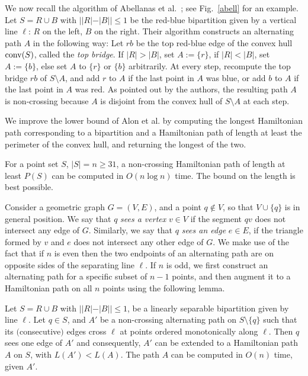 \documentclass[proceedings]{stacs}
\begin{document}
We now recall the algorithm of Abellanas et al.~\cite{AGH+99};
see Fig.~\ref{abell} for an example.
Let $S=R \cup B$ with $||R|-|B|| \leq 1$ be the red-blue bipartition
given by a vertical line $\ell$: $R$ on the left, $B$ on the right.
Their algorithm constructs an alternating path $A$ in the following way:
Let $rb$ be the top red-blue edge of
the convex hull ${\rm conv}(S)$, called the {\em top bridge}. If $|R|>|B|$,
set $A := \{r\}$, if $|R|<|B|$, set $A := \{b\}$, else
set $A$ to $\{r\}$ or $\{b\}$ arbitrarily. At every step, recompute
the top bridge $rb$ of $S \setminus A$, and add $r$ to $A$
if the last point in $A$ was blue, or add $b$ to $A$
if the last point in $A$ was red.  As pointed out by the authors, the
resulting path $A$ is non-crossing because $A$ is disjoint from the
convex hull of $S \setminus A$ at each step.

We improve the lower bound of Alon et al. by computing the longest
Hamiltonian path corresponding to a bipartition and a Hamiltonian path of
length at least the perimeter of the convex hull, and returning the
longest of the two.
\begin{lemma} \label{L1}
For a point set $S$, $|S| =n \geq 31$, a non-crossing Hamiltonian
path of length at least $P(S)$ can be computed in $O(n \log{n})$
time. The bound on the length is best possible.
\end{lemma}


Consider a geometric graph $G=(V,E)$, and a point $q \notin V$,
so that $V \cup \{q\}$ is in general position.
We say that $q$ {\em sees a vertex} $v \in V$ if the segment $q v$  does not intersect any
edge of $G$. Similarly, we say that $q$ {\em sees an edge} $e \in E$,
if the triangle formed by $v$ and $e$ does not intersect any other edge of
$G$.
We make use of the fact that if $n$ is even then the two endpoints of an
alternating path are on opposite sides of the separating line $\ell$.
If $n$ is odd, we first construct an alternating path for a specific subset of
$n-1$ points, and then augment it to a Hamiltonian path on all $n$ points using
the following lemma.

\begin{lemma} \label{L2}
Let $S=R \cup B$ with $||R|-|B|| \leq 1$, be a linearly separable bipartition
given by line $\ell$. Let $q \in S$, and $A'$ be a non-crossing alternating
path on $S \setminus \{q\}$ such that its $($consecutive$)$ edges cross $\ell$ at
points ordered monotonically along $\ell$. Then $q$ sees one edge of
$A'$ and consequently, $A'$ can be extended to a Hamiltonian path $A$ on $S$, with
$L(A')<L(A)$. The path $A$ can be computed in $O(n)$ time, given $A'$.
\end{lemma}
\end{document}
